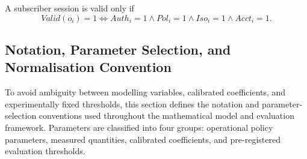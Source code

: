 A subscriber session is valid only if
\begin{equation}
  Valid(o_i)=1\Longleftrightarrow Auth_i=1\land Pol_i=1\land Iso_i=1\land Acct_i=1.
  \label{eq:valid-session}
\end{equation}

\subsection{Notation, Parameter Selection, and Normalisation Convention}
\label{sec:notation-parameter-policy}

To avoid ambiguity between modelling variables, calibrated coefficients, and
experimentally fixed thresholds, this section defines the notation and
parameter-selection conventions used throughout the mathematical model and evaluation
framework. Parameters are classified into four groups: operational policy parameters,
measured quantities, calibrated coefficients, and pre-registered evaluation thresholds.

